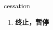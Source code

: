 
\begin{frame}
{\huge cessation}
\begin{center}
\begin{enumerate}\Large
  \item \textbf{终止，暂停}
\end{enumerate}
\end{center}
\end{frame}
